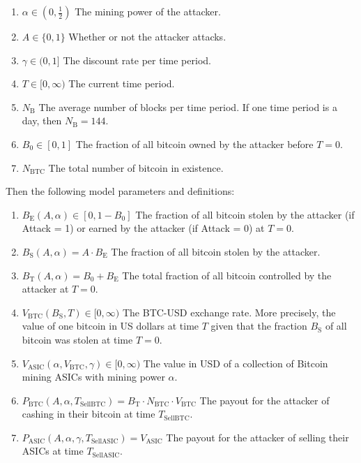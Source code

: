 \documentclass[12pt]{article}
\newcommand*{\Attack}{A}
\newcommand*{\Time}{T}
\newcommand*{\ABtcOrig}{{B_0}}
\newcommand*{\ABtcEarned}{{B_{\mathrm{E}}}}
\newcommand*{\ABtcStolen}{{B_{\mathrm{S}}}}
\newcommand*{\ABtcTotal}{{B_{\mathrm{T}}}}
\newcommand*{\NumBtc}{{N_{\mathrm{BTC}}}}
\newcommand*{\ExchgRate}{{V_{\mathrm{BTC}}}}
\newcommand*{\AsicValue}{{V_{\mathrm{ASIC}}}}
\newcommand*{\TimeCashOut}{{T_{\mathrm{SellBTC}}}}
\newcommand*{\TimeSellAsics}{{T_{\mathrm{SellASIC}}}}
\newcommand*{\PayoffBtc}{{P_{\mathrm{BTC}}}}
\newcommand*{\PayoffAsic}{{P_{\mathrm{ASIC}}}}
\newcommand*{\BlocksPerPeriod}{{N_{\mathrm{B}}}}
\newenvironment{defs}
  { \begin{enumerate}[labelindent=0pt,labelwidth=2.5in,itemindent=0em,align=parleft,leftmargin=!] }
  { \end{enumerate} }
\begin{document}
\begin{defs}
  \item[{$\alpha \in (0, \frac{1}{2})$}]
    The mining power of the attacker.
  \item[{$\Attack \in \{0, 1\}$}]
    Whether or not the attacker attacks.
  \item[{$\gamma \in (0, 1]$}]
    The discount rate per time period.
  \item[{$\Time \in [0, \infty)$}]
    The current time period.
  \item[{$\BlocksPerPeriod$}]
    The average number of blocks per time period. If one time period is a day, then $\BlocksPerPeriod = 144$.
  \item[{$\ABtcOrig \in [0, 1]$}]
    The fraction of all bitcoin owned by the attacker before $T = 0$.
  \item[{$\NumBtc$}]
    The total number of bitcoin in existence.
\end{defs}

Then the following model parameters and definitions:

\begin{defs}
  \item[{$\ABtcEarned(\Attack, \alpha) \in [0, 1 - B_0]$}]
    The fraction of all bitcoin stolen by the attacker (if Attack = 1) or
    earned by the attacker (if Attack = 0) at $\Time = 0$.
  \item[{$\ABtcStolen(\Attack, \alpha)
      = \Attack \cdot \ABtcEarned$}]
    The fraction of all bitcoin stolen by the attacker.
  \item[{$\ABtcTotal(\Attack, \alpha)
      = \ABtcOrig + \ABtcEarned$}]
    The total fraction of all bitcoin controlled by the attacker at $\Time = 0$.
  \item[{$\ExchgRate(\ABtcStolen, \Time) \in [0, \infty)$}]
    The BTC-USD exchange rate. More precisely, the value of one bitcoin in US
    dollars at time $\Time$ given that the fraction $\ABtcStolen$ of all
    bitcoin was stolen at time $\Time = 0$.
  \item[{$\AsicValue(\alpha, \ExchgRate, \gamma) \in [0, \infty)$}]
    The value in USD of a collection of Bitcoin mining ASICs with mining power $\alpha$.
  \item[{$\PayoffBtc(\Attack, \alpha, \TimeCashOut)
      = \ABtcTotal \cdot \NumBtc \cdot \ExchgRate$}]
    The payout for the attacker of cashing in their bitcoin at time $\TimeCashOut$.
  \item[{$\PayoffAsic(\Attack, \alpha, \gamma, \TimeSellAsics)
      = \AsicValue$}]
    The payout for the attacker of selling their ASICs at time $\TimeSellAsics$.
\end{defs}
\end{document}
